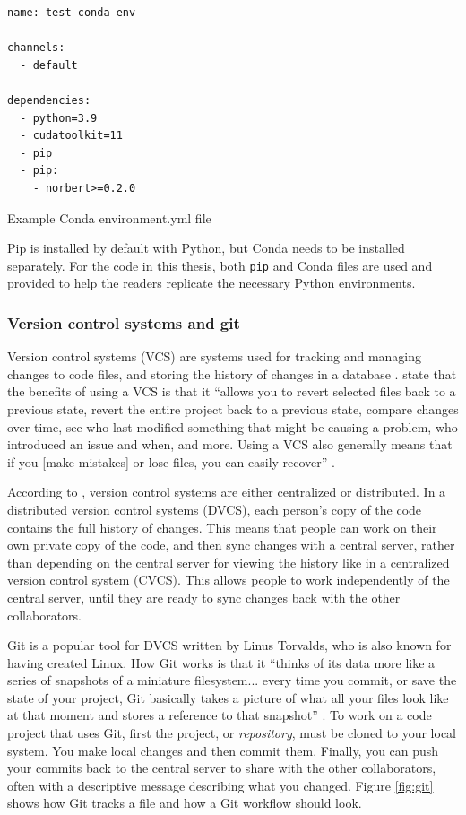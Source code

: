 \documentclass[report.tex]{subfiles}
\begin{document}
\begin{listing}[ht]
\centering
\begin{BVerbatim}
name: test-conda-env

channels:
  - default

dependencies:
  - python=3.9
  - cudatoolkit=11
  - pip
  - pip:
    - norbert>=0.2.0
\end{BVerbatim}
	\caption{Example Conda environment.yml file}
	\label{lst:condayml}
\end{listing}

Pip is installed by default with Python, but Conda needs to be installed separately. For the code in this thesis, both \Verb#pip# and Conda files are used and provided to help the readers replicate the necessary Python environments.

\subsubsection{Version control systems and git}
\label{sec:gitvcs}

Version control systems (VCS) are systems used for tracking and managing changes to code files, and storing the history of changes in a database \parencite{gitbook}. \citeauthor{gitbook} state that the benefits of using a VCS is that it ``allows you to revert selected files back to a previous state, revert the entire project back to a previous state, compare changes over time, see who last modified something that might be causing a problem, who introduced an issue and when, and more. Using a VCS also generally means that if you [make mistakes] or lose files, you can easily recover'' \parencite[1]{gitbook}.

According to \textcite{gitbook}, version control systems are either centralized or distributed. In a distributed version control systems (DVCS), each person's copy of the code contains the full history of changes. This means that people can work on their own private copy of the code, and then sync changes with a central server, rather than depending on the central server for viewing the history like in a centralized version control system (CVCS). This allows people to work independently of the central server, until they are ready to sync changes back with the other collaborators.

Git is a popular tool for DVCS written by Linus Torvalds, who is also known for having created Linux. How Git works is that it ``thinks of its data more like a series of snapshots of a miniature filesystem... every time you commit, or save the state of your project, Git basically takes a picture of what all your files look like at that moment and stores a reference to that snapshot'' \parencite[6]{gitbook}. To work on a code project that uses Git, first the project, or \textit{repository}, must be cloned to your local system. You make local changes and then commit them. Finally, you can push your commits back to the central server to share with the other collaborators, often with a descriptive message describing what you changed. Figure \ref{fig:git} shows how Git tracks a file and how a Git workflow should look.
\end{document}
